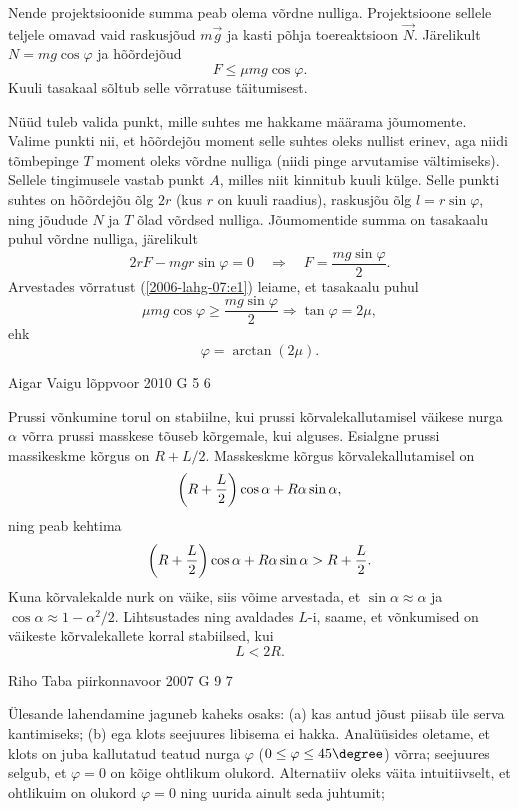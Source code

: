 \documentclass[11pt, twoside]{article}
\begin{document}
{{Nende projektsioonide summa peab olema võrdne nulliga. Projektsioone sellele teljele omavad vaid raskusjõud $m\vec g$ ja kasti põhja toereaktsioon $\vec N$. Järelikult
$N = mg \cos \varphi$ ja hõõrdejõud
\begin{equation} \label{2006-lahg-07:e1}
F \leq \mu mg \cos\varphi.
\end{equation}
Kuuli tasakaal sõltub selle võrratuse täitumisest.

Nüüd tuleb valida punkt, mille suhtes me hakkame määrama jõumomente. Valime punkti nii, et hõõrdejõu moment selle suhtes oleks nullist erinev, aga niidi tõmbepinge $T$ moment oleks võrdne nulliga (niidi pinge arvutamise vältimiseks). Sellele tingimusele vastab punkt $A$, milles niit kinnitub kuuli külge. Selle punkti suhtes on hõõrdejõu õlg $2r$ (kus $r$ on kuuli raadius), raskusjõu õlg $l = r \sin \varphi$, ning jõudude $N$ ja $T$ õlad võrdsed nulliga. Jõumomentide summa on tasakaalu puhul võrdne nulliga, järelikult
\[
2 r F-m g r \sin \varphi=0 \quad \Rightarrow \quad F=\frac{m g \sin \varphi}{2}.
\]
Arvestades võrratust (\ref{2006-lahg-07:e1}) leiame, et tasakaalu puhul
\[
\mu m g \cos \varphi \geq \frac{m g \sin \varphi}{2} \Rightarrow \tan \varphi=2 \mu,
\]
ehk
\[
\varphi = \arctan (2\mu).
\]
\fi
}

{Aigar Vaigu} %
{lõppvoor} %
{2010} %
{G 5} %
{6} %
{

\ifSolution
Prussi võnkumine torul on stabiilne, kui prussi
kõrvalekallutamisel väikese nurga $\alpha$ võrra prussi masskese
tõuseb kõrgemale, kui alguses. Esialgne prussi massikeskme kõrgus on $R+L/2$.
Masskeskme kõrgus kõrvalekallutamisel on
\[\left(R+{L \over 2}\right)\cos\alpha+R\alpha\sin\alpha,\]
ning peab kehtima
\[\left(R+{L \over 2}\right)\cos\alpha+R\alpha\sin\alpha >R+{L \over 2}.\]
Kuna kõrvalekalde nurk on väike, siis võime arvestada, et
$\sin\alpha\approx \alpha$ ja $\cos\alpha\approx 1-\alpha^2/2$. Lihtsustades ning avaldades $L$-i, saame, et võnkumised on väikeste kõrvalekallete korral stabiilsed, kui
\[L<2R.\]
\fi
}

{Riho Taba} %
{piirkonnavoor} %
{2007} %
{G 9} %
{7} %
{

\ifSolution
Ülesande lahendamine jaguneb kaheks osaks: (a) kas antud jõust piisab üle serva kantimiseks; (b) ega klots seejuures libisema ei hakka. Analüüsides oletame, et klots on juba kallutatud teatud nurga $\varphi$ ($0 \leq \varphi \leq 45\degree$) võrra; seejuures selgub, et $\varphi = 0$ on kõige ohtlikum olukord. Alternatiiv oleks väita intuitiivselt, et ohtlikuim on olukord $\varphi = 0$ ning uurida ainult seda juhtumit;

}}
\end{document}
